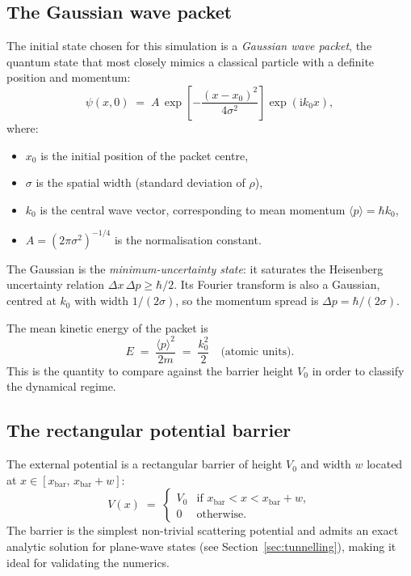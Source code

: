 \documentclass[12pt, a4paper]{article}
\newcommand{\ii}{\mathrm{i}}          %
\begin{document}
\subsection{The Gaussian wave packet}

The initial state chosen for this simulation is a \emph{Gaussian wave
packet}, the quantum state that most closely mimics a classical particle
with a definite position and momentum:
\begin{equation}
  \psi(x,0) \;=\; A\,\exp\!\left[-\frac{(x-x_0)^2}{4\sigma^2}\right]
  \exp\!\left(\ii k_0 x\right),
  \label{eq:gauss}
\end{equation}
where:
\begin{itemize}
  \item $x_0$ is the initial position of the packet centre,
  \item $\sigma$ is the spatial width (standard deviation of $\rho$),
  \item $k_0$ is the central wave vector, corresponding to mean momentum
        $\langle p\rangle = \hbar k_0$,
  \item $A = (2\pi\sigma^2)^{-1/4}$ is the normalisation constant.
\end{itemize}

The Gaussian is the \emph{minimum-uncertainty state}: it saturates the
Heisenberg uncertainty relation $\Delta x\,\Delta p \geq \hbar/2$.  Its
Fourier transform is also a Gaussian, centred at $k_0$ with width
$1/(2\sigma)$, so the momentum spread is $\Delta p = \hbar/(2\sigma)$.

The mean kinetic energy of the packet is
\begin{equation}
  E \;=\; \frac{\langle p\rangle^2}{2m} \;=\; \frac{k_0^2}{2}
  \quad \text{(atomic units)}.
  \label{eq:energy}
\end{equation}
This is the quantity to compare against the barrier height $V_0$ in order
to classify the dynamical regime.

\subsection{The rectangular potential barrier}

The external potential is a rectangular barrier of height $V_0$ and width
$w$ located at $x \in [x_\text{bar},\, x_\text{bar}+w]$:
\begin{equation}
  V(x) \;=\;
  \begin{cases}
    V_0 & \text{if } x_\text{bar} < x < x_\text{bar} + w, \\
    0   & \text{otherwise.}
  \end{cases}
  \label{eq:barrier}
\end{equation}
The barrier is the simplest non-trivial scattering potential and admits an
exact analytic solution for plane-wave states (see
Section~\ref{sec:tunnelling}), making it ideal for validating the
numerics.
\end{document}
